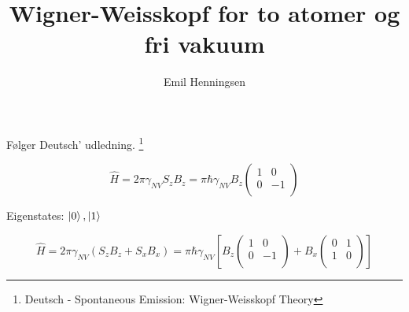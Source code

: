 \documentclass{article}
\begin{document}
\title{Wigner-Weisskopf for to atomer og fri vakuum}
\author{Emil Henningsen}
\maketitle

Følger Deutsch' udledning. \footnote[1]{Deutsch - Spontaneous Emission: Wigner-Weisskopf Theory}

\begin{equation}
    \hat{H} = 2\pi \gamma_{NV} S_z B_z = \pi \hbar \gamma_{NV} B_z \begin{pmatrix} 1 & 0 \\ 0 & -1 \\ \end{pmatrix}
\end{equation}

Eigenstates: ${\ket{0}, \ket{1}}$

\begin{equation}
    \hat{H} = 2 \pi \gamma_{NV} (S_z B_z + S_x B_x) = \pi \hbar \gamma_{NV} \left[ B_z \begin{pmatrix} 1 & 0 \\ 0 & -1 \\ \end{pmatrix} + B_x \begin{pmatrix} 0 & 1 \\ 1 & 0 \\ \end{pmatrix} \right]
\end{equation}
\end{document}
